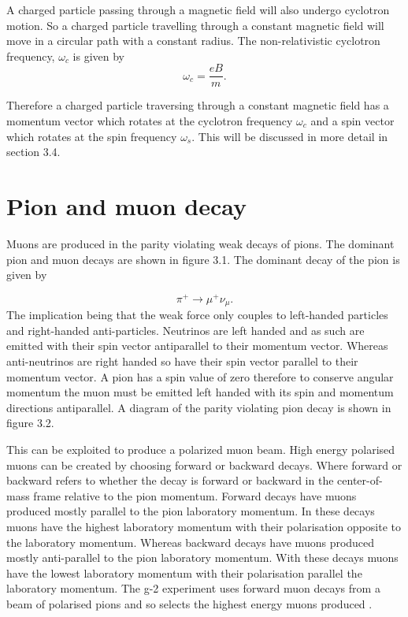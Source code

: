 A charged particle passing through a magnetic field will also undergo cyclotron motion. So a charged particle travelling through a constant magnetic field will move in a circular path with a constant radius. The non-relativistic cyclotron frequency, $\omega_{c}$ is given by
\begin{equation}
\omega_{c} = \frac{eB}{{m}}.
\end{equation}

Therefore a charged particle traversing through a constant magnetic field has a momentum vector which rotates at the cyclotron frequency $\omega_{c}$ and a spin vector which rotates at the spin frequency $\omega_{s}$. This will be discussed in more detail in section 3.4.

\section{Pion and muon decay}

Muons are produced in the parity violating weak decays of pions. The dominant pion and muon decays are shown in figure 3.1. The dominant decay of the pion is given by

\begin{equation}
{\pi^{+}}\rightarrow{\mu^{+}}\nu{_\mu}.
\end{equation}
\noindent
The implication being that the weak force only couples to left-handed particles and right-handed anti-particles. Neutrinos are left handed and as such are emitted with their spin vector antiparallel to their momentum vector. Whereas anti-neutrinos are right handed so have their spin vector parallel to their momentum vector. A pion has a spin value of zero therefore to conserve angular momentum the muon must be emitted left handed with its spin and momentum directions antiparallel. A diagram of the parity violating pion decay is shown in figure 3.2.

This can be exploited to produce a polarized muon beam. High energy polarised muons can be created by choosing forward or backward decays. Where forward or backward refers to whether the decay is forward or backward in the center-of-mass frame relative to the pion momentum. Forward decays have muons produced mostly parallel to the pion laboratory momentum. In these decays muons have the highest laboratory momentum with their polarisation opposite to the laboratory momentum. Whereas backward decays have muons produced mostly anti-parallel to the pion laboratory momentum. With these decays muons have the lowest laboratory momentum with their polarisation parallel the laboratory momentum. The g-2 experiment uses forward muon decays from a beam of polarised pions and so selects the highest energy muons produced \cite{Reference29}.

